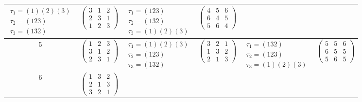 \begin{longtable}{|c|p{2.7cm}|p{2.5cm}|p{2.7cm}|p{2.5cm}|p{2.7cm}|}
    $\begin{array}{l}\tau_1=(1)(2)(3)\\ \tau_2=(123)\\ \tau_3=(132)\end{array}$ &
    $\begin{pmatrix}3&1&2\\2&3&1\\1&2&3\end{pmatrix}$                           &
    $\begin{array}{l}\tau_1=(123)\\ \tau_2=(132)\\ \tau_3=(1)(2)(3)\end{array}$ &
    $\begin{pmatrix}4&5&6\\6&4&5\\5&6&4\end{pmatrix}$                                                                                                       \\
    \hline
    5                                                                           &
    $\begin{pmatrix}1&2&3\\3&1&2\\2&3&1\end{pmatrix}$                           &
    $\begin{array}{l}\tau_1=(1)(2)(3)\\ \tau_2=(123)\\ \tau_3=(132)\end{array}$ &
    $\begin{pmatrix}3&2&1\\1&3&2\\2&1&3\end{pmatrix}$                           &
    $\begin{array}{l}\tau_1=(132)\\ \tau_2=(123)\\ \tau_3=(1)(2)(3)\end{array}$ &
    $\begin{pmatrix}5&5&6\\6&5&5\\5&6&5\end{pmatrix}$                                                                                                       \\
    \hline
    6                                                                           &
    $\begin{pmatrix}1&3&2\\2&1&3\\3&2&1\end{pmatrix}$                           &

\end{longtable}
